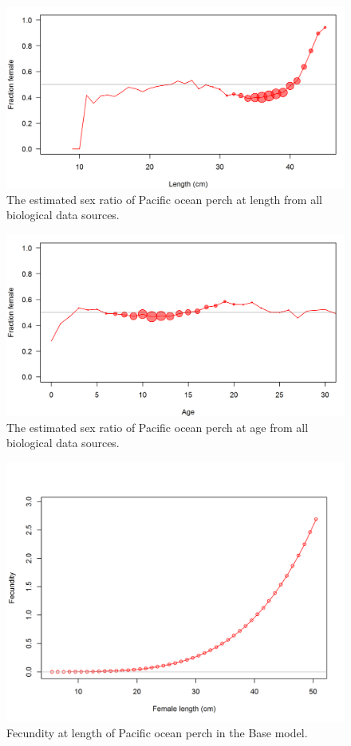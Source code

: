 \documentclass[12pt,]{article}
\begin{document}
\FloatBarrier

\begin{figure}
\centering
\includegraphics{Figures/allSexRatios.png}
\caption{The estimated sex ratio of Pacific ocean perch at length from
all biological data sources. \label{fig:sexratio}}
\end{figure}

\begin{figure}
\centering
\includegraphics{Figures/allSexRatiosAge.png}
\caption{The estimated sex ratio of Pacific ocean perch at age from all
biological data sources. \label{fig:sexratio_Age}}
\end{figure}

\begin{figure}
\centering
\includegraphics{r4ss/plots_mod1/bio9_fecundity_len.png}
\caption{Fecundity at length of Pacific ocean perch in the Base model.
\label{fig:fecundity}}
\end{figure}
\end{document}
